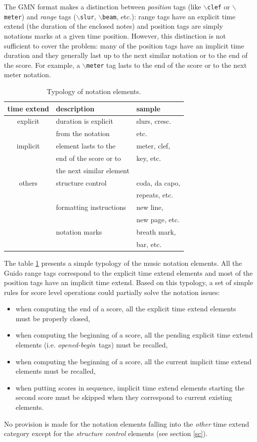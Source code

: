\documentclass{article}
\newcommand{\code}[1]	{{\small \texttt{#1}}}
\newcommand{\gtag}[1]	{$\backslash$\code{#1}}
\newcommand{\obeg}		{\emph{opened-begin}}
\begin{document}
The GMN format makes a distinction between \emph{position} tags (like \gtag{clef} or \gtag{meter}) and \emph{range} tags (\gtag{slur}, \gtag{beam}, etc.): range tags have an explicit time extend (the duration of the enclosed notes) and position tags are simply notations marks at a given time position. However, this distinction is not sufficient to cover the problem: many of the position tags have an implicit time duration and they generally last up to the next similar notation or to the end of the score. For example, a \gtag{meter} tag lasts to the end of the score or to the next meter notation.
\begin{table}[htdp]
\caption{Typology of notation elements.}
\begin{center}
\begin{tabular}{cll}
time extend & description & sample \\
\hline
explicit 	& duration is explicit 	& slurs, cresc. \\
			& from the notation		& etc. \\
implicit 	& element lasts to the	& meter, clef, \\
			& end of the score or to	& key, etc. \\
			& the next similar element	& \\
others 		& structure control	& coda, da capo, \\
			& 	& repeats, etc. \\
	 		& formatting instructions	& new line, \\
			& 	& new page, etc. \\
	 		& notation marks	& breath mark, \\
			& 	& bar, etc. \\
\hline
\end{tabular}
\end{center}
\label{types}
\end{table}
The table \ref{types} presents a simple typology of the music notation elements.
All the Guido range tags correspond to the explicit time extend elements and most of the position tags have an implicit time extend. Based on this typology, a set of simple rules for score level operations could partially solve the notation issues:
\begin{itemize}
\item when computing the end of a score, all the explicit time extend elements must be properly closed,
\item when computing the beginning of a score, all the pending explicit time extend elements (i.e. \obeg\ tags) must be recalled,
\item when computing the beginning of a score, all the current implicit time extend elements must be recalled,
\item when putting scores in sequence, implicit time extend elements starting the second score must be skipped when they correspond to current existing elements.
\end{itemize}
No provision is made for the notation elements falling into the \emph{other} time extend category except for the \emph{structure control} elements (see section \ref{sc}).
\end{document}
